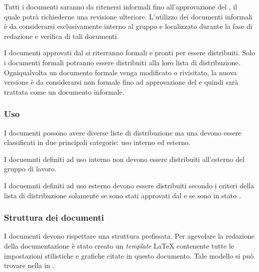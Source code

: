 \documentclass[12pt,a4paper]{article}
\begin{document}
Tutti i documenti saranno da ritenersi informali fino all’approvazione del \PM, il quale potrà richiederne una revisione ulteriore. L’utilizzo dei documenti informali è da considerarsi esclusivamente interno al gruppo e localizzato durante la fase di redazione e verifica di tali documenti.

I documenti approvati dal \PM{} si riterranno formali e pronti per essere distribuiti. Solo i documenti formali potranno essere distribuiti alla loro lista di distribuzione. Ogniqualvolta un documento formale venga modificato o rivisitato, la nuova versione è da considerarsi non formale fino ad approvazione del \PM e quindi sarà trattata come un documento informale.

\subsubsection{Uso}
I documenti possono avere diverse liste di distribuzione ma una devono essere classificati in due principali categorie: uso interno ed esterno.

I docuemnti definiti ad uso interno non devono essere distribuiti all'esterno del gruppo di lavoro.

I docuemnti definiti ad uso esterno devono essere distribuiti secondo i criteri della lista di distribuzione solamente se sono stati approvati dal \PM{} e se sono in stato .

\subsubsection{Struttura dei documenti}
I documenti devono rispettare una struttura prefissata. Per agevolare la redazione della documentazione è stato creato un \emph{template} \LaTeX{} contenente tutte le impostazioni stilistiche e grafiche citate in questo documento. Tale modello si può trovare nella  in .
\end{document}
